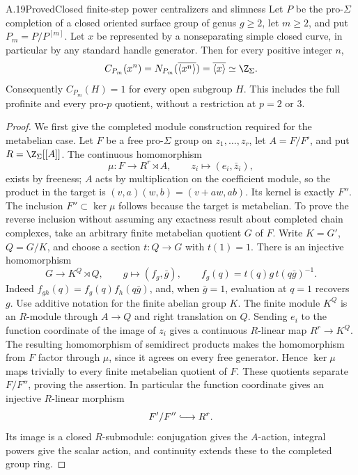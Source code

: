 \begin{claim}{A.19}{Proved}{Closed finite-step power centralizers and slimness}
Let $P$ be the pro-$\Sigma$ completion of a closed oriented surface group of genus $g\ge2$, let $m\ge2$, and put $P_m=P/P^{[m]}$. Let $x$ be represented by a nonseparating simple closed curve, in particular by any standard handle generator. Then for every positive integer $n$,
\[
 C_{P_m}(x^n)=N_{P_m}(\overline{\langle x^n\rangle})
 =\overline{\langle x\rangle}\simeq\Z_\Sigma.
\]
Consequently $C_{P_m}(H)=1$ for every open subgroup $H$. This includes the full profinite and every pro-$p$ quotient, without a restriction at $p=2$ or $3$.
\end{claim}
\begin{proof}
We first give the completed module construction required for the metabelian case. Let $F$ be a free pro-$\Sigma$ group on $z_1,\ldots,z_r$, let $A=F/F'$, and put $R=\Z_\Sigma[[A]]$. The continuous homomorphism
\[
 \mu:F\longrightarrow R^r\rtimes A,
 \qquad z_i\longmapsto(e_i,\bar z_i),
\]
exists by freeness; $A$ acts by multiplication on the coefficient module, so the product in the target is $(v,a)(w,b)=(v+aw,ab)$. Its kernel is exactly $F''$. The inclusion $F''\subset\ker\mu$ follows because the target is metabelian. To prove the reverse inclusion without assuming any exactness result about completed chain complexes, take an arbitrary finite metabelian quotient $G$ of $F$. Write $K=G'$, $Q=G/K$, and choose a section $t:Q\to G$ with $t(1)=1$. There is an injective homomorphism
\[
 G\longrightarrow K^Q\rtimes Q,
 \qquad g\longmapsto(f_g,\bar g),\qquad
 f_g(q)=t(q)g\,t(q\bar g)^{-1}.
\]
Indeed $f_{gh}(q)=f_g(q)f_h(q\bar g)$, and, when $\bar g=1$, evaluation at $q=1$ recovers $g$. Use additive notation for the finite abelian group $K$. The finite module $K^Q$ is an $R$-module through $A\to Q$ and right translation on $Q$. Sending $e_i$ to the function coordinate of the image of $z_i$ gives a continuous $R$-linear map $R^r\to K^Q$. The resulting homomorphism of semidirect products makes the homomorphism from $F$ factor through $\mu$, since it agrees on every free generator. Hence $\ker\mu$ maps trivially to every finite metabelian quotient of $F$. These quotients separate $F/F''$, proving the assertion. In particular the function coordinate gives an injective $R$-linear morphism
\[
 F'/F''\lhook\joinrel\longrightarrow R^r.
\]
Its image is a closed $R$-submodule: conjugation gives the $A$-action, integral powers give the scalar action, and continuity extends these to the completed group ring.


\end{proof}
